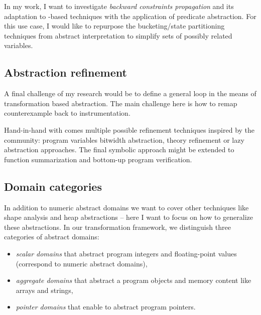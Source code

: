 In my work, I want to investigate \emph{backward constraints propagation} and
its adaptation to \cegar-based techniques with the application of predicate
abstraction. For this use case, I would like to repurpose the bucketing/state
partitioning techniques from abstract interpretation to simplify sets of
possibly related variables.



\subsection{Abstraction refinement}


A final challenge of my research would be to define a general \cegar loop in the
means of transformation based abstraction. The main challenge here is how to
remap counterexample back to instrumentation.

Hand-in-hand with \cegar comes multiple possible refinement techniques inspired
by the \smt community: program variables bitwidth abstraction, theory refinement
or lazy abstraction approaches. The final symbolic approach might be extended
to function summarization and bottom-up program verification.



\subsection{ Domain categories }

In addition to numeric abstract domains we want to cover other techniques like
shape analysis and heap abstractions -- here I want to focus on how to
generalize these abstractions. In our transformation framework, we distinguish
three categories of abstract domains:

\begin{itemize}
    \item \emph{scalar domains} that abstract program integers and floating-point values (correspond to numeric abstract domains),
    \item \emph{aggregate domains} that abstract a program objects and memory content like arrays and strings,

    \item \emph{pointer domains} that enable to abstract program pointers.
\end{itemize}

